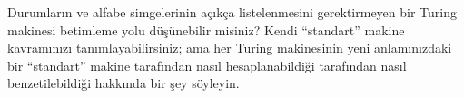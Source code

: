 \begin{prob}
  Durumların ve alfabe simgelerinin açıkça listelenmesini gerektirmeyen bir
  Turing makinesi betimleme yolu düşünebilir misiniz? Kendi ``standart''
  makine kavramınızı tanımlayabilirsiniz; ama her Turing makinesinin yeni
  anlamınızdaki bir ``standart'' makine tarafından nasıl hesaplanabildiği
  tarafından nasıl benzetilebildiği hakkında bir şey söyleyin.
\end{prob}

